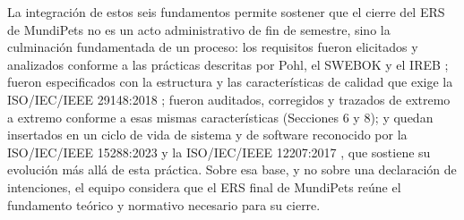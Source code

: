 \documentclass[journal,onecolumn]{IEEEtran}
\begin{document}
La integración de estos seis fundamentos permite sostener que el cierre del ERS de MundiPets no es un
acto administrativo de fin de semestre, sino la culminación fundamentada de un proceso: los requisitos
fueron elicitados y analizados conforme a las prácticas descritas por Pohl, el SWEBOK y el IREB
\cite{pohl2025,swebok2024,ireb2026}; fueron especificados con la estructura y las características de
calidad que exige la ISO/IEC/IEEE 29148:2018 \cite{ieee29148}; fueron auditados, corregidos y trazados
de extremo a extremo conforme a esas mismas características (Secciones 6 y 8); y quedan insertados en
un ciclo de vida de sistema y de software reconocido por la ISO/IEC/IEEE 15288:2023 y la
ISO/IEC/IEEE 12207:2017 \cite{iso15288,iso12207}, que sostiene su evolución más allá de esta práctica.
Sobre esa base, y no sobre una declaración de intenciones, el equipo considera que el ERS final de
MundiPets reúne el fundamento teórico y normativo necesario para su cierre.

\printbibliography[heading=none]
\end{document}
